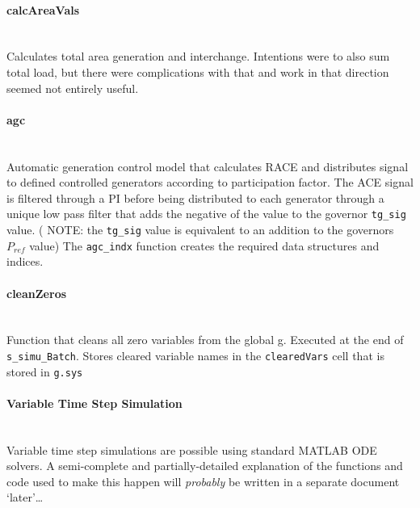 \documentclass[12pt]{article}
\begin{document}
\paragraph{calcAreaVals} \ \\
Calculates total area generation and interchange.
Intentions were to also sum total load, but there were complications with that and work in that direction seemed not entirely useful.

\paragraph{agc} \ \\
Automatic generation control model that calculates RACE and distributes signal to defined controlled generators according to participation factor.
The ACE signal is filtered through a PI before being distributed to each generator through a unique low pass filter that adds the negative of the value to the governor \verb|tg_sig| value.
( NOTE: the \verb|tg_sig| value is equivalent to an addition to the governors $P_{ref}$ value)
The \verb|agc_indx| function creates the required data structures and indices.

\paragraph{cleanZeros} \ \\
Function that cleans all zero variables from the global g.
Executed at the end of \verb|s_simu_Batch|.
Stores cleared variable names in the \verb|clearedVars| cell that is stored in \verb|g.sys|

\paragraph{Variable Time Step Simulation} \ \\
Variable time step simulations are possible using standard MATLAB ODE solvers.
A semi-complete and partially-detailed explanation of the functions and code used to make this happen will \emph{probably} be written in a separate document `later'\ldots
\end{document}
